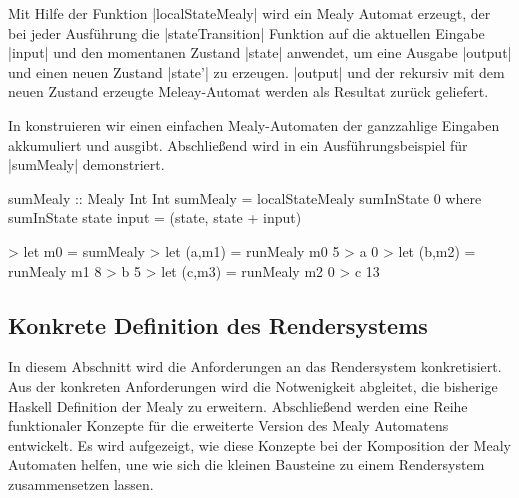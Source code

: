 Mit Hilfe der Funktion |localStateMealy| wird ein Mealy Automat erzeugt, der bei jeder Ausführung die |stateTransition| Funktion auf die aktuellen Eingabe |input| und den momentanen Zustand |state| anwendet, um eine Ausgabe |output| und einen neuen Zustand |state'| zu erzeugen. |output| und der rekursiv mit dem neuen Zustand erzeugte Meleay-Automat werden als Resultat zurück geliefert.

In  konstruieren wir einen einfachen Mealy-Automaten der ganzzahlige Eingaben akkumuliert und ausgibt. Abschließend wird in  ein Ausführungsbeispiel für |sumMealy| demonstriert.

\begin{haskell}[label={lst:state-mealy-beispiel},caption={[Beispiel Mealy Automat mit lokalem Zustand]Beispiel Mealy Automat mit lokalem Zustand}]
sumMealy :: Mealy Int Int
sumMealy = localStateMealy sumInState 0 where
	sumInState state input = (state, state + input)
\end{haskell}

\begin{haskell}[label={lst:state-mealy-ausfuehrung},nolol,caption={Ausführung Mealy Automat mit lokalem Zustand}]
> let m0 = sumMealy
> let (a,m1) = runMealy m0 5
> a
0
> let (b,m2) = runMealy m1 8
> b
5
> let (c,m3) = runMealy m2 0
> c
13
\end{haskell}

\subsection{Konkrete Definition des Rendersystems}
\label{sec:konkret-rendersystem}

In diesem Abschnitt wird die Anforderungen an das Rendersystem konkretisiert. Aus der konkreten Anforderungen wird die Notwenigkeit abgleitet, die bisherige Haskell Definition der Mealy zu erweitern. Abschließend werden eine Reihe funktionaler Konzepte für die erweiterte Version des Mealy Automatens entwickelt. Es wird aufgezeigt, wie diese Konzepte bei der Komposition der Mealy Automaten helfen, une wie sich die kleinen Bausteine zu einem Rendersystem zusammensetzen lassen.

